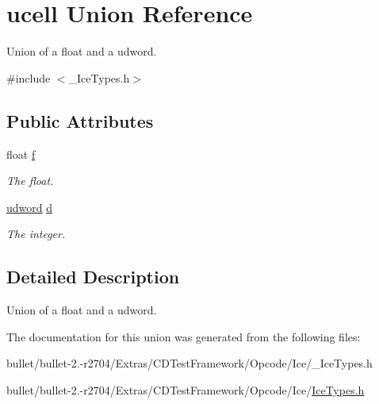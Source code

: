 \hypertarget{unionucell}{\section{ucell Union Reference}
\label{unionucell}
}


Union of a float and a udword.  




{\ttfamily \#include $<$\+\_\+\+Ice\+Types.\+h$>$}

\subsection*{Public Attributes}
\begin{DoxyCompactItemize}
\item 
\hypertarget{unionucell_a15c1e89749e0c8c8d1a1318e04b64e86}{float \hyperlink{unionucell_a15c1e89749e0c8c8d1a1318e04b64e86}{f}}\label{unionucell_a15c1e89749e0c8c8d1a1318e04b64e86}

\begin{DoxyCompactList}\small\item\em The float. \end{DoxyCompactList}\item 
\hypertarget{unionucell_a054210bf23564d385aef75d5450d83cc}{\hyperlink{_ice_types_8h_a44c6f1920ba5551225fb534f9d1a1733}{udword} \hyperlink{unionucell_a054210bf23564d385aef75d5450d83cc}{d}}\label{unionucell_a054210bf23564d385aef75d5450d83cc}

\begin{DoxyCompactList}\small\item\em The integer. \end{DoxyCompactList}\end{DoxyCompactItemize}


\subsection{Detailed Description}
Union of a float and a udword. 

The documentation for this union was generated from the following files\+:\begin{DoxyCompactItemize}
\item 
bullet/bullet-\/2.-\/r2704/\+Extras/\+C\+D\+Test\+Framework/\+Opcode/\+Ice/\+\_\+\+Ice\+Types.\+h\item 
bullet/bullet-\/2.-\/r2704/\+Extras/\+C\+D\+Test\+Framework/\+Opcode/\+Ice/\hyperlink{_ice_types_8h}{Ice\+Types.\+h}\end{DoxyCompactItemize}
